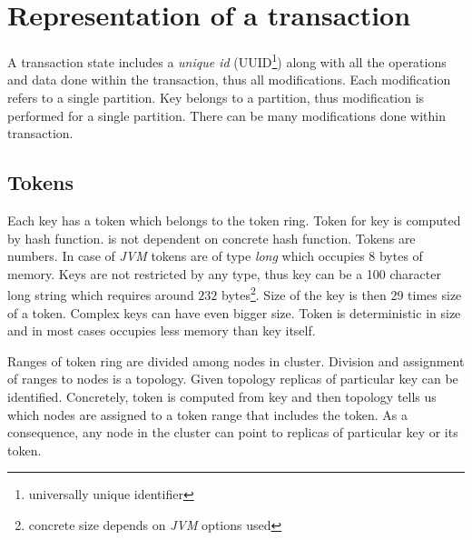 
\section{Representation of a transaction}
A transaction state includes a \emph{unique id} (UUID\footnote{universally unique identifier}) along with all the operations and data done within the transaction, thus all modifications. 
Each modification refers to a single partition. Key belongs to a partition, thus modification is performed for a single partition. There can be many modifications done within transaction. 

\subsection{Tokens}

Each key has a token which belongs to the token ring. Token for key is computed by hash function. \mpp is not dependent on concrete hash function. Tokens are numbers. In case of \emph{JVM} tokens are of type \emph{long} which occupies 8 bytes of memory. Keys are not restricted by any type, thus key can be a 100 character long string which requires around $232$ bytes\footnote{concrete size depends on \emph{JVM} options used}. Size of the key is then 29 times size of a token. Complex keys can have even bigger size. Token is deterministic in size and in most cases occupies less memory than key itself.

Ranges of token ring are divided among nodes in cluster. Division and assignment of ranges to nodes is a topology. Given topology replicas of particular key can be identified. Concretely, token is computed from key and then topology tells us which nodes are assigned to a token range that includes the token. As a consequence, any node in the cluster can point to replicas of particular key or its token.


